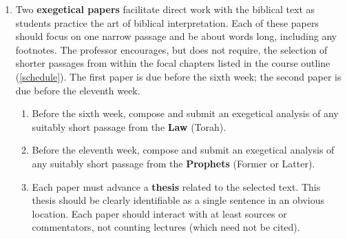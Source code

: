 \documentclass[titlepage]{article}
\begin{document}
\begin{enumerate}
\begin{enumerate}
	\end{enumerate}


	\item Two \textbf{exegetical papers} facilitate direct work with the
	biblical text as students practice the art of biblical
	interpretation. Each of these papers should focus on one narrow
	passage and be about  words long, including any
	footnotes. The professor encourages, but does not require, the
	selection of shorter passages from within the focal chapters listed
	in the course outline (\autoref{schedule}). The first paper is due
	before the sixth week; the second paper is due before the eleventh
	week.


	\begin{enumerate}

		\item Before the sixth week, compose and submit an exegetical
		analysis of any suitably short passage from the \textbf{Law}
		(Torah).

		\item Before the eleventh week, compose and submit an
		exegetical analysis of any suitably short passage from the
		\textbf{Prophets} (Former or Latter).

		\item Each paper must advance a \textbf{thesis} related to the
		selected text. This thesis should be clearly identifiable as a
		single sentence in an obvious location. Each paper should
		interact with at least  sources or
		commentators, not counting lectures (which need not be cited).
		

\end{enumerate}
\end{enumerate}
\end{document}
